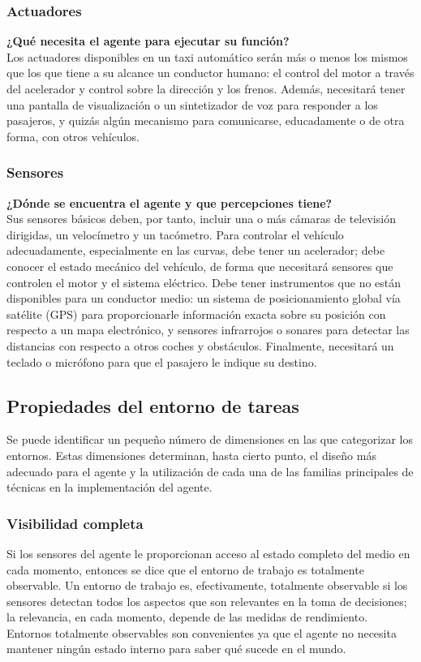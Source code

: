 \documentclass[12pt,a4paper]{report}
\begin{document}
\subsubsection*{Actuadores}
\textbf{¿Qué necesita el agente para ejecutar su función?}\\Los actuadores disponibles en un taxi automático serán más o menos los mismos que los que tiene a su alcance un conductor humano: el control del motor a través del acelerador y control sobre la dirección y los frenos. Además, necesitará tener una pantalla de visualización o un sintetizador de voz para responder a los pasajeros, y quizás algún mecanismo para comunicarse, educadamente o de otra forma, con otros vehículos.
\subsubsection*{Sensores}
\textbf{¿Dónde se encuentra el agente y que percepciones tiene?}\\Sus sensores básicos deben, por tanto, incluir una o más cámaras de televisión dirigidas, un velocímetro y un tacómetro. Para controlar el vehículo adecuadamente, especialmente en las curvas, debe tener un acelerador; debe conocer el estado mecánico del vehículo, de forma que necesitará sensores que controlen el motor y el sistema eléctrico. Debe tener instrumentos que no están disponibles para un conductor medio: un sistema de posicionamiento global vía satélite (GPS) para proporcionarle información exacta sobre su posición con respecto a un mapa electrónico, y sensores infrarrojos o sonares para detectar las distancias con respecto a otros coches y obstáculos. Finalmente, necesitará un teclado o micrófono para que el pasajero le indique su destino.
\subsection*{Propiedades del entorno de tareas} 
Se puede identificar un pequeño número de dimensiones en las que categorizar los entornos. Estas dimensiones determinan, hasta cierto punto, el diseño más adecuado para el agente y la utilización de cada una de las familias principales de técnicas en la implementación del agente.
\subsubsection{Visibilidad completa}
Si los sensores del agente le proporcionan acceso al estado completo del medio en cada momento, entonces se dice que el entorno de trabajo es totalmente observable. Un entorno de trabajo es, efectivamente, totalmente observable si los sensores detectan todos los aspectos que son relevantes en la toma de decisiones; la relevancia, en cada momento, depende de las medidas de rendimiento. Entornos totalmente observables son convenientes ya que el agente no necesita mantener ningún estado interno para saber qué sucede en el mundo.
\end{document}
